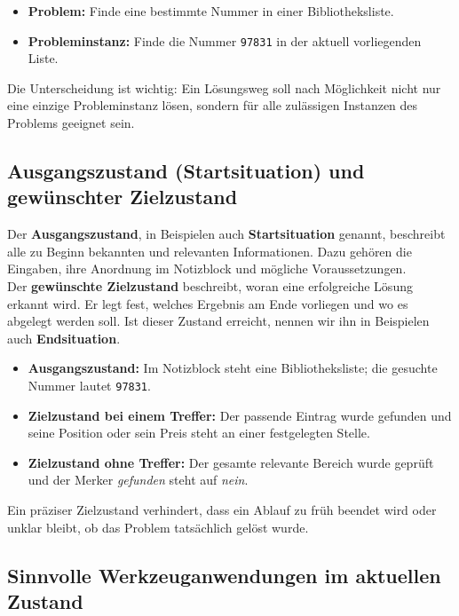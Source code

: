\documentclass{article}
\begin{document}
\begin{itemize}
  \item \textbf{Problem:} Finde eine bestimmte Nummer in einer Bibliotheksliste.
  \item \textbf{Probleminstanz:} Finde die Nummer \texttt{97831} in der aktuell vorliegenden Liste.
\end{itemize}

Die Unterscheidung ist wichtig: Ein Lösungsweg soll nach Möglichkeit nicht nur eine einzige Probleminstanz lösen, sondern für alle zulässigen Instanzen des Problems geeignet sein.

\subsection{Ausgangszustand (Startsituation) und gewünschter Zielzustand}

Der \textbf{Ausgangszustand}, in Beispielen auch \textbf{Startsituation} genannt, beschreibt alle zu Beginn bekannten und relevanten Informationen. Dazu gehören die Eingaben, ihre Anordnung im Notizblock und mögliche Voraussetzungen.\\
Der \textbf{gewünschte Zielzustand} beschreibt, woran eine erfolgreiche Lösung erkannt wird. Er legt fest, welches Ergebnis am Ende vorliegen und wo es abgelegt werden soll. Ist dieser Zustand erreicht, nennen wir ihn in Beispielen auch \textbf{Endsituation}.

\begin{itemize}
  \item \textbf{Ausgangszustand:} Im Notizblock steht eine Bibliotheksliste; die gesuchte Nummer lautet \texttt{97831}.
  \item \textbf{Zielzustand bei einem Treffer:} Der passende Eintrag wurde gefunden und seine Position oder sein Preis steht an einer festgelegten Stelle.
  \item \textbf{Zielzustand ohne Treffer:} Der gesamte relevante Bereich wurde geprüft und der Merker \emph{gefunden} steht auf \emph{nein}.
\end{itemize}

Ein präziser Zielzustand verhindert, dass ein Ablauf zu früh beendet wird oder unklar bleibt, ob das Problem tatsächlich gelöst wurde.

\subsection{Sinnvolle Werkzeuganwendungen im aktuellen Zustand}
\end{document}

